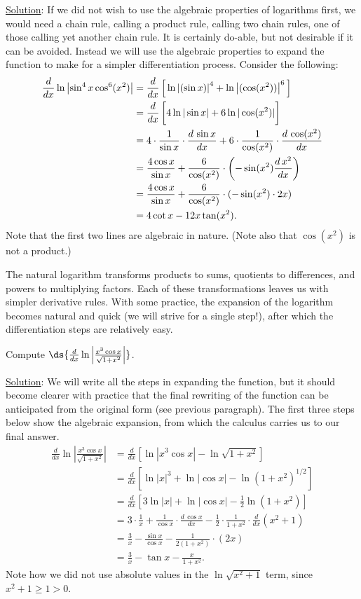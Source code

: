 \underline{Solution}: If we did not wish to use the algebraic
properties of logarithms first, we would need a chain rule,
calling a product rule, calling two chain rules,
one of those calling yet another chain rule.  It is certainly do-able, but
not desirable if it can be avoided.  Instead we will use
the algebraic properties to expand the function to make
for a simpler differentiation process.  Consider the following:
\begin{align*}
\frac{d}{dx}\ln\left|\sin^4x\cos^6(x^2)\right|
  &=\frac{d}{dx}
          \left[\,\ln\left|(\sin x)\right|^4
               +\ln\left|(\cos(x^2))\right|^6
                \,\right]\\
  &=\frac{d}{dx}\left[\vphantom{\frac11}4\ln|\sin x|+6\ln|\cos (x^2)|\right]\\
  &=4\cdot\frac1{\sin x}\cdot\frac{d\,\sin x}{dx}
      +6\cdot\frac1{\cos (x^2)}\cdot\frac{d\,\cos (x^2)}{dx}\\
  &=\frac{4\cos x}{\sin x}+\frac6{\cos(x^2)}\cdot\left(-\sin (x^2)\frac{d\,x^2}
                   {dx}\right)\\
  &=\frac{4\cos x}{\sin x}+\frac6{\cos(x^2)}\cdot(-\sin (x^2)\cdot2x)\\
  &=4\cot x-12x\tan( x^2).\end{align*}
Note that the first two lines are algebraic in  nature. (Note also
that $\cos(x^2)$ is not a product.)
\eex


The natural logarithm transforms products to sums, quotients to
differences, and powers to multiplying factors.  
Each of these transformations leaves us with simpler derivative
rules.  With some practice, the expansion of the logarithm
becomes natural and quick (we will strive for
a single step!), after which the differentiation
steps are relatively easy.

\bex Compute $\ds{\frac{d}{dx}\ln\left|\frac{x^3\cos x}{\sqrt{1+x^2}}\right|}$.

\underline{Solution}: We will write all the steps in expanding the
function, but it should become clearer with practice that
the final rewriting of the function can be anticipated from
the original form (see previous paragraph).  
The first three steps below show the algebraic
expansion, from which the calculus carries us to our final answer.
\begin{align*}
\frac{d}{dx}\ln\left|\frac{x^3\cos x}{\sqrt{1+x^2}}\right|
  &=\frac{d}{dx}\left[\ln|x^3\cos x|-\ln\sqrt{1+x^2}\right]\\
  &=\frac{d}{dx}\left[\ln|x|^3+\ln|\cos x|-\ln(1+x^2)^{1/2}\right]\\
  &=\frac{d}{dx}\left[3\ln|x|+\ln|\cos x|-\frac12\ln(1+x^2)\right]\\
  &=3\cdot\frac1x+\frac1{\cos x}\cdot\frac{d\,\cos x}{dx}
                 -\frac12\cdot\frac1{1+x^2}\cdot\frac{d}{dx}(x^2+1)\\
  &=\frac3x-\frac{\sin x}{\cos x}-\frac1{2(1+x^2)}\cdot(2x)\\
  &=\frac3x-\tan x-\frac{x}{1+x^2}.
\end{align*}
Note how we did not use absolute values in the $\ln\sqrt{x^2+1}$
term, since $x^2+1\ge1>0$. 
\eex

